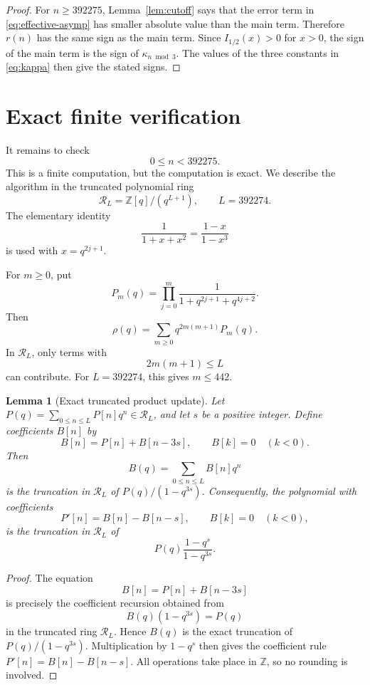 \documentclass[11pt]{article}
\newtheorem{lemma}[theorem]{Lemma}
\theoremstyle{remark}
\newcommand{\Z}{\mathbb Z}
\begin{document}
\begin{proof}
For $n\geq392275$, Lemma~\ref{lem:cutoff} says that the error term in
\eqref{eq:effective-asymp} has smaller absolute value than the main term.
Therefore $r(n)$ has the same sign as the main term.  Since
$I_{1/2}(x)>0$ for $x>0$, the sign of the main term is the sign of
$\kappa_{n\bmod3}$.  The values of the three constants in \eqref{eq:kappa}
then give the stated signs.
\end{proof}

\section{Exact finite verification}\label{sec:finite-verification}

It remains to check
\[
0\leq n<392275.
\]
This is a finite computation, but the computation is exact.  We describe the
algorithm in the truncated polynomial ring
\[
\mathcal R_L=\Z[q]/(q^{L+1}),
\qquad
L=392274.
\]
The elementary identity
\begin{equation}\label{eq:factor-identity}
\frac1{1+x+x^2}=\frac{1-x}{1-x^3}
\end{equation}
is used with $x=q^{2j+1}$.

For $m\geq0$, put
\[
P_m(q)=\prod_{j=0}^{m}\frac1{1+q^{2j+1}+q^{4j+2}}.
\]
Then
\[
\rho(q)=\sum_{m\geq0}q^{2m(m+1)}P_m(q).
\]
In \(\mathcal R_L\), only terms with
\[
2m(m+1)\leq L
\]
can contribute.  For $L=392274$, this gives $m\leq442$.

\begin{lemma}[Exact truncated product update]\label{lem:truncated-update}
Let $P(q)=\sum_{0\leq n\leq L}P[n]q^n\in\mathcal R_L$, and let $s$ be a
positive integer.  Define coefficients $B[n]$ by
\[
B[n]=P[n]+B[n-3s],
\qquad
B[k]=0\quad(k<0).
\]
Then
\[
B(q)=\sum_{0\leq n\leq L}B[n]q^n
\]
is the truncation in $\mathcal R_L$ of $P(q)/(1-q^{3s})$.  Consequently, the
polynomial with coefficients
\[
P'[n]=B[n]-B[n-s],
\qquad
B[k]=0\quad(k<0),
\]
is the truncation in $\mathcal R_L$ of
\[
P(q)\frac{1-q^s}{1-q^{3s}}.
\]
\end{lemma}

\begin{proof}
The equation
\[
B[n]=P[n]+B[n-3s]
\]
is precisely the coefficient recursion obtained from
\[
B(q)(1-q^{3s})=P(q)
\]
in the truncated ring $\mathcal R_L$.  Hence $B(q)$ is the exact truncation of
$P(q)/(1-q^{3s})$.  Multiplication by $1-q^s$ then gives the coefficient rule
$P'[n]=B[n]-B[n-s]$.  All operations take place in $\Z$, so no rounding is
involved.
\end{proof}
\end{document}
